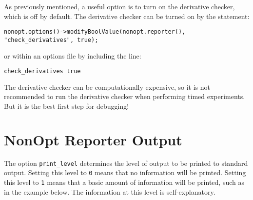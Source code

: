 \documentclass{article}
\begin{document}
As previously mentioned, a useful option is to turn on the derivative checker, which is off by default. The derivative checker can be turned on by the statement:
\begin{verbatim}
nonopt.options()->modifyBoolValue(nonopt.reporter(), "check_derivatives", true);
\end{verbatim}
or within an options file by including the line:
\begin{verbatim}
check_derivatives true
\end{verbatim}
The derivative checker can be computationally expensive, so it is not recommended to run the derivative checker when performing timed experiments. But it is the best first step for debugging!

\section{NonOpt Reporter Output}

The option \texttt{print\_level} determines the level of output to be printed to standard output.  Setting this level to \texttt{0} means that no information will be printed.  Setting this level to \texttt{1} means that a basic amount of information will be printed, such as in the example below.  The information at this level is self-explanatory.
\end{document}
